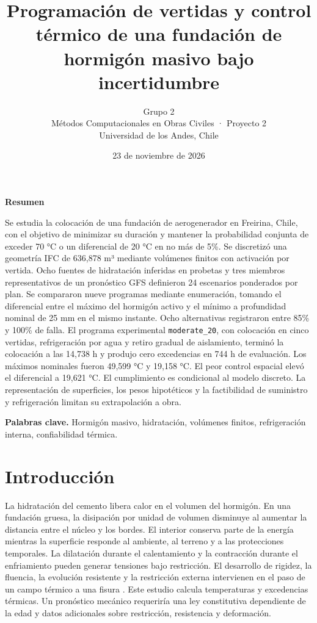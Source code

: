 \documentclass[11pt,a4paper]{article}
\title{Programación de vertidas y control térmico de una fundación de hormigón masivo bajo incertidumbre}
\author{Grupo 2\\Métodos Computacionales en Obras Civiles · Proyecto 2\\Universidad de los Andes, Chile}
\date{23 de noviembre de 2026}
\newcommand{\plan}[1]{\texttt{#1}}
\begin{document}
\maketitle
\begin{center}\textbf{Resumen}\end{center}
Se estudia la colocación de una fundación de aerogenerador en Freirina, Chile, con el objetivo de minimizar su duración y mantener la probabilidad conjunta de exceder 70 °C o un diferencial de 20 °C en no más de 5\%. Se discretizó una geometría IFC de 636,878 m³ mediante volúmenes finitos con activación por vertida. Ocho fuentes de hidratación inferidas en probetas y tres miembros representativos de un pronóstico GFS definieron 24 escenarios ponderados por plan. Se compararon nueve programas mediante enumeración, tomando el diferencial entre el máximo del hormigón activo y el mínimo a profundidad nominal de 25 mm en el mismo instante. Ocho alternativas registraron entre 85\% y 100\% de falla. El programa experimental \plan{moderate\_20}, con colocación en cinco vertidas, refrigeración por agua y retiro gradual de aislamiento, terminó la colocación a las 14,738 h y produjo cero excedencias en 744 h de evaluación. Los máximos nominales fueron 49,599 °C y 19,158 °C. El peor control espacial elevó el diferencial a 19,621 °C. El cumplimiento es condicional al modelo discreto. La representación de superficies, los pesos hipotéticos y la factibilidad de suministro y refrigeración limitan su extrapolación a obra.

\textbf{Palabras clave.} Hormigón masivo, hidratación, volúmenes finitos, refrigeración interna, confiabilidad térmica.

\section{Introducción}
La hidratación del cemento libera calor en el volumen del hormigón. En una fundación gruesa, la disipación por unidad de volumen disminuye al aumentar la distancia entre el núcleo y los bordes. El interior conserva parte de la energía mientras la superficie responde al ambiente, al terreno y a las protecciones temporales. La dilatación durante el calentamiento y la contracción durante el enfriamiento pueden generar tensiones bajo restricción. El desarrollo de rigidez, la fluencia, la evolución resistente y la restricción externa intervienen en el paso de un campo térmico a una fisura \cite{aci,ciria}. Este estudio calcula temperaturas y excedencias térmicas. Un pronóstico mecánico requeriría una ley constitutiva dependiente de la edad y datos adicionales sobre restricción, resistencia y deformación.
\end{document}
